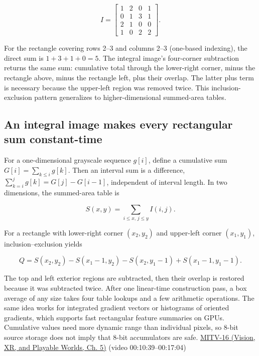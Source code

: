 \[
I=\begin{bmatrix}1&2&0&1\\0&1&3&1\\2&1&0&0\\1&0&2&2\end{bmatrix}.
\]

For the rectangle covering rows 2--3 and columns 2--3 (one-based indexing), the direct sum is \(1+3+1+0=5\). The integral image's four-corner subtraction returns the same sum: cumulative total through the lower-right corner, minus the rectangle above, minus the rectangle left, plus their overlap. The latter plus term is necessary because the upper-left region was removed twice. This inclusion-exclusion pattern generalizes to higher-dimensional summed-area tables.

\subsection{An integral image makes every rectangular sum constant-time}\label{03-visual-computing-i-ch004-an-integral-image-makes-every-rectangular-sum-constant-time}

\hypertarget{03-visual-computing-i-ch004-an-integral-image-makes-every-rectangular-sum-constant-time}{}

For a one-dimensional grayscale sequence \(g[i]\), define a cumulative sum \(G[i]=\sum_{k\le i}g[k]\). Then an interval sum is a difference, \(\sum_{k=i}^{j}g[k]=G[j]-G[i-1]\), independent of interval length. In two dimensions, the summed-area table is

\[
S(x,y)=\sum_{i\le x,\,j\le y}I(i,j).
\]

For a rectangle with lower-right corner \((x_2,y_2)\) and upper-left corner \((x_1,y_1)\), inclusion--exclusion yields

\[
Q=S(x_2,y_2)-S(x_1-1,y_2)-S(x_2,y_1-1)+S(x_1-1,y_1-1).
\]

The top and left exterior regions are subtracted, then their overlap is restored because it was subtracted twice. After one linear-time construction pass, a box average of any size takes four table lookups and a few arithmetic operations. The same idea works for integrated gradient vectors or histograms of oriented gradients, which supports fast rectangular feature summaries on GPUs. Cumulative values need more dynamic range than individual pixels, so 8-bit source storage does not imply that 8-bit accumulators are safe. \href{../07-Vision-XR-and-Playable-Worlds/main.pdf\#nameddest=04-visual-computing-ii-ch036-mitv-16---fast-convolution-low-pass-filter-approximations-integral-images-us-6457032}{MITV-16 (Vision, XR, and Playable Worlds, Ch. 5)} (video 00:10:39--00:17:04)

